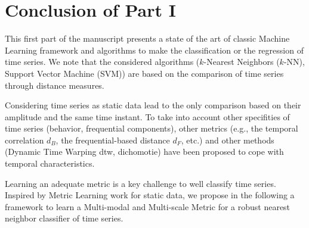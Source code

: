 \part*{Conclusion of Part I}
This first part of the manuscript presents a state of the art of classic Machine Learning framework and algorithms to make the classification or the regression of time series. We note that the considered algorithms ($k$-Nearest Neighbors ($k$-NN), Support Vector Machine (SVM)) are based on the comparison of time series through distance measures. 

Considering time series as static data lead to the only comparison based on their amplitude and the same time instant. To take into account other specifities of time series (behavior, frequential components), other metrics (e.g., the temporal correlation $d_B$, the frequential-based distance $d_F$, etc.) and other methods (Dynamic Time Warping {\sc dtw}, dichomotie)  have been proposed to cope with temporal characteristics. 

Learning an adequate metric is a key challenge to well classify time series. Inspired by Metric Learning work for static data, we propose in the following a framework to learn a Multi-modal and Multi-scale Metric for a robust nearest neighbor classifier of time series.
